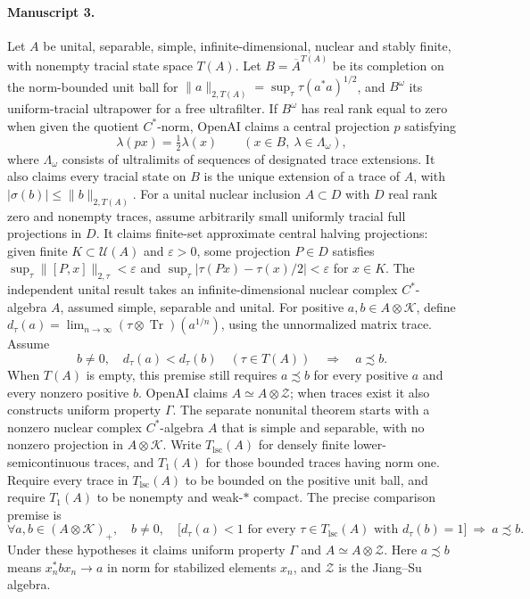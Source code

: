\documentclass[11pt]{article}
\begin{document}
\paragraph{Manuscript 3.}
Let $A$ be unital, separable, simple, infinite-dimensional, nuclear and stably finite, with nonempty tracial state space $T(A)$. Let $B=\overline A^{T(A)}$ be its completion on the norm-bounded unit ball for $\|a\|_{2,T(A)}=\sup_\tau\tau(a^*a)^{1/2}$, and $B^\omega$ its uniform-tracial ultrapower for a free ultrafilter. If $B^\omega$ has real rank equal to zero when given the quotient $C^*$-norm, OpenAI claims a central projection $p$ satisfying
\[
\lambda(px)=\tfrac12\lambda(x)\qquad(x\in B,\ \lambda\in\Lambda_\omega),
\]
where $\Lambda_\omega$ consists of ultralimits of sequences of designated trace extensions. It also claims every tracial state on $B$ is the unique extension of a trace of $A$, with $|\sigma(b)|\le\|b\|_{2,T(A)}$.
For a unital nuclear inclusion $A\subset D$ with $D$ real rank zero and nonempty traces, assume arbitrarily small uniformly tracial full projections in $D$. It claims finite-set approximate central halving projections: given finite $K\subset\mathcal U(A)$ and $\varepsilon>0$, some projection $P\in D$ satisfies $\sup_\tau\|[P,x]\|_{2,\tau}<\varepsilon$ and $\sup_\tau|\tau(Px)-\tau(x)/2|<\varepsilon$ for $x\in K$.
The independent unital result takes an infinite-dimensional nuclear complex $C^*$-algebra $A$, assumed simple, separable and unital. For positive $a,b\in A\otimes\mathcal K$, define $d_\tau(a)=\lim_{n\to\infty}(\tau\otimes\operatorname{Tr})(a^{1/n})$, using the unnormalized matrix trace. Assume
\[
b\ne0,\quad d_\tau(a)<d_\tau(b)\quad(\tau\in T(A))\quad\Longrightarrow\quad a\precsim b.
\]
When $T(A)$ is empty, this premise still requires $a\precsim b$ for every positive $a$ and every nonzero positive $b$. OpenAI claims $A\simeq A\otimes\mathcal Z$; when traces exist it also constructs uniform property $\Gamma$.
The separate nonunital theorem starts with a nonzero nuclear complex $C^*$-algebra $A$ that is simple and separable, with no nonzero projection in $A\otimes\mathcal K$. Write $T_{\mathrm{lsc}}(A)$ for densely finite lower-semicontinuous traces, and $T_1(A)$ for those bounded traces having norm one. Require every trace in $T_{\mathrm{lsc}}(A)$ to be bounded on the positive unit ball, and require $T_1(A)$ to be nonempty and weak-$*$ compact. The precise comparison premise is
\[
\forall a,b\in(A\otimes\mathcal K)_+,\quad b\ne0,\quad
\bigl[d_\tau(a)<1\text{ for every }\tau\in T_{\mathrm{lsc}}(A)\text{ with }d_\tau(b)=1\bigr]
\ \Longrightarrow\ a\precsim b.
\]
Under these hypotheses it claims uniform property $\Gamma$ and $A\simeq A\otimes\mathcal Z$. Here $a\precsim b$ means $x_n^*bx_n\to a$ in norm for stabilized elements $x_n$, and $\mathcal Z$ is the Jiang--Su algebra.
\end{document}
